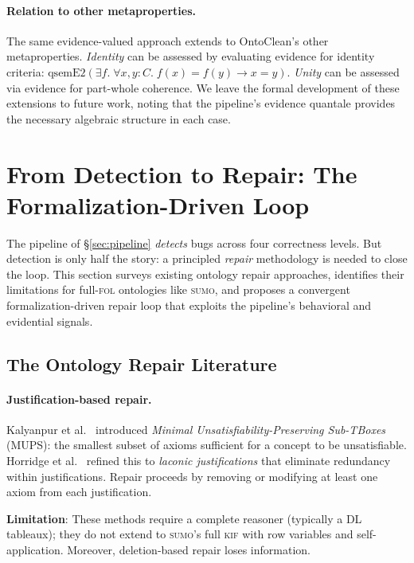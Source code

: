 \documentclass[11pt]{article}
\newcommand{\KIF}{\textsc{kif}}
\newcommand{\SUMO}{\textsc{sumo}}
\newcommand{\FOL}{\textsc{fol}}
\theoremstyle{definition}
\theoremstyle{plain}
\begin{document}
\paragraph{Relation to other metaproperties.}
The same evidence-valued approach extends to OntoClean's other
metaproperties.  \emph{Identity} can be assessed by evaluating
evidence for identity criteria: $\mathrm{qsemE2}(\exists f.\;
\forall x,y : C.\; f(x) = f(y) \to x = y)$.  \emph{Unity} can be
assessed via evidence for part-whole coherence.  We leave the formal
development of these extensions to future work, noting that the
pipeline's evidence quantale provides the necessary algebraic
structure in each case.

\section{From Detection to Repair: The Formalization-Driven Loop}
\label{sec:repair}

The pipeline of \S\ref{sec:pipeline} \emph{detects} bugs across four
correctness levels.  But detection is only half the story: a principled
\emph{repair} methodology is needed to close the loop.  This section
surveys existing ontology repair approaches, identifies their limitations
for full-\FOL{} ontologies like \SUMO{}, and proposes a convergent
formalization-driven repair loop that exploits the pipeline's behavioral
and evidential signals.

\subsection{The Ontology Repair Literature}

\paragraph{Justification-based repair.}
Kalyanpur et al.~\cite{kalyanpur2005} introduced \emph{Minimal
Unsatisfiability-Preserving Sub-TBoxes} (MUPS): the smallest subset of
axioms sufficient for a concept to be unsatisfiable.  Horridge et
al.~\cite{horridge2008laconic} refined this to \emph{laconic
justifications} that eliminate redundancy within justifications.
Repair proceeds by removing or modifying at least one axiom from each
justification.

\textbf{Limitation}: These methods require a complete reasoner (typically
a DL tableaux); they do not extend to \SUMO{}'s full \KIF{} with row
variables and self-application.  Moreover, deletion-based repair loses
information.
\end{document}
